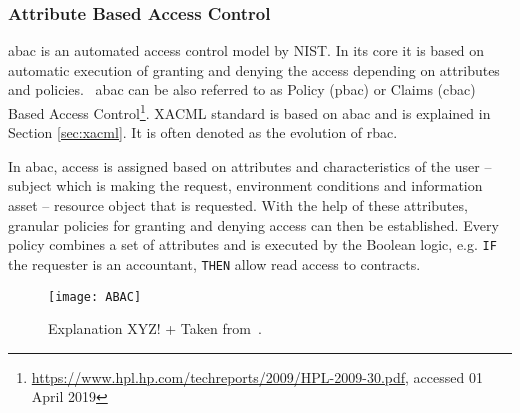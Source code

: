 \subsubsection{Attribute Based Access Control} \label{sec:sota-abac}

\acrfull{abac} is an automated access control model by NIST. In its core it is based on automatic execution of granting and denying the access depending on attributes and policies.~\cite{NISTAttributeControl} \acrshort{abac} can be also referred to as Policy (\acrshort{pbac}) or Claims (\acrshort{cbac}) Based Access Control\footnote{\url{https://www.hpl.hp.com/techreports/2009/HPL-2009-30.pdf}, accessed 01 April 2019}. XACML standard is based on \acrshort{abac} and is explained in Section \ref{sec:xacml}. It is often denoted as the evolution of \acrshort{rbac}.

In \acrshort{abac}, access is assigned based on attributes and characteristics of the user – subject which is making the request, environment conditions and information asset – resource object that is requested. With the help of these attributes, granular policies for granting and denying access can then be established. Every policy combines a set of attributes and is executed by the Boolean logic, e.g. \texttt{IF} the requester is an accountant, \texttt{THEN} allow read access to contracts.

\begin{figure}[ht]
    \centering
    \texttt{[image: ABAC]}
    \caption{Explanation XYZ! + 
    Taken from~\cite{AttributeABAC}.}
    \label{fig:ABAC_diagram_sota}
\end{figure}